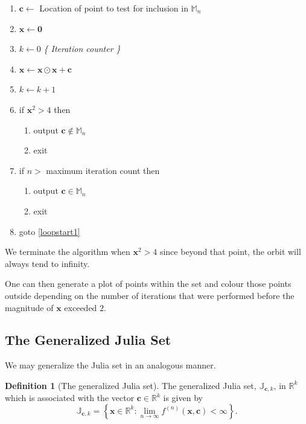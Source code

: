 \documentclass{elsart}
\theoremstyle{definition}
\newtheorem{definition}{Definition}
\newcommand{\complexprod}{\odot}
\begin{document}
\begin{enumerate}
\item $\mathbf{c} \leftarrow$ Location of point to test for inclusion in $\mathbb{M}_n$
\item $\mathbf{x} \leftarrow \mathbf{0}$
\item $k \leftarrow 0$ \emph{\{ Iteration counter \}}
\item $\mathbf{x} \leftarrow \mathbf{x} \complexprod \mathbf{x} + \mathbf{c}$ \label{loopstart1}
\item $k \leftarrow k + 1$
\item if $\mathbf{x}^2 > 4$ then
  \begin{enumerate}
  \item output $\mathbf{c} \notin \mathbb{M}_n$
  \item exit
  \end{enumerate}
\item if $n > $ maximum iteration count then
  \begin{enumerate}
  \item output $\mathbf{c} \in \mathbb{M}_n$
  \item exit
  \end{enumerate}
\item goto \ref{loopstart1}
\end{enumerate}

We terminate the algorithm when $\mathbf{x}^2 > 4$ since beyond that point,
the orbit will always tend to infinity.

One can then generate a plot of points within the set and colour those points
outside depending on the number of iterations that were performed before
the magnitude of $\mathbf{x}$ exceeded $2$.

\subsection{The Generalized Julia Set}

We may generalize the Julia set in an analogous manner.

\begin{definition}[The generalized Julia set]
The generalized Julia set, $\mathbb{J}_{\mathbf{c},k}$, in $\mathbb{R}^k$
which is associated with the vector $\mathbf{c} \in \mathbb{R}^k$ is given by
\begin{equation}
\mathbb{J}_{\mathbf{c},k} = 
\left\{\mathbf{x} \in \mathbb{R}^k
: \lim_{n \rightarrow \infty} f^{(n)}(\mathbf{x},\mathbf{c}) < \infty \right\}.
\end{equation}
\end{definition}
\end{document}
